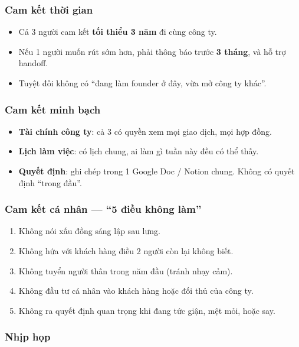\documentclass[11pt,a4paper]{article}
\begin{document}
\subsubsection*{Cam kết thời gian}

\begin{itemize}
\item Cả 3 người cam kết \textbf{tối thiểu 3 năm} đi cùng công ty.
\item Nếu 1 người muốn rút sớm hơn, phải thông báo trước \textbf{3 tháng}, và hỗ trợ handoff.
\item Tuyệt đối không có ``đang làm founder ở đây, vừa mở công ty khác''.
\end{itemize}

\subsubsection*{Cam kết minh bạch}

\begin{itemize}
\item \textbf{Tài chính công ty}: cả 3 có quyền xem mọi giao dịch, mọi hợp đồng.
\item \textbf{Lịch làm việc}: có lịch chung, ai làm gì tuần này đều có thể thấy.
\item \textbf{Quyết định}: ghi chép trong 1 Google Doc / Notion chung. Không có
quyết định ``trong đầu''.
\end{itemize}

\subsubsection*{Cam kết cá nhân --- ``5 điều không làm''}

\begin{enumerate}
\item Không nói xấu đồng sáng lập sau lưng.
\item Không hứa với khách hàng điều 2 người còn lại không biết.
\item Không tuyển người thân trong năm đầu (tránh nhạy cảm).
\item Không đầu tư cá nhân vào khách hàng hoặc đối thủ của công ty.
\item Không ra quyết định quan trọng khi đang tức giận, mệt mỏi, hoặc say.
\end{enumerate}

\subsubsection*{Nhịp họp}
\end{document}
